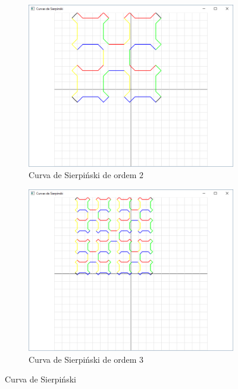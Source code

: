 \begin{enumerate}
  \begin{figure}[!htp]
          \centering
          \begin{subfigure}[t]{0.4\textwidth}
              \centerline{\includegraphics[width=.9\textwidth]{img/cap4_ex16b}}
              \caption{Curva de Sierpiński de ordem $2$}
              \label{fig:cap03_ex14a}
          \end{subfigure}
          \hfill
          \begin{subfigure}[t]{0.4\textwidth}
              \centerline{\includegraphics[width=.9\textwidth]{img/cap4_ex16c}}
              \caption{Curva de Sierpiński de ordem $3$}
              \label{fig:cap03_ex14b}
          \end{subfigure}
          
          \caption{
            \label{fig:koch}%
            Curva de Sierpiński
          }

        \end{figure}
  
\end{enumerate}

